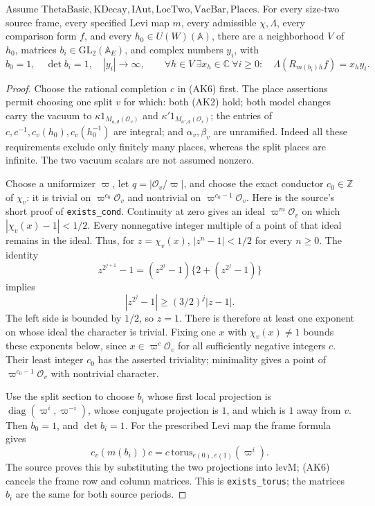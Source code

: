 \begin{srproposition}
\label{prop:sr-source-key-two-producer}
Assume \(\mathrm{ThetaBasic},\mathrm{KDecay},\mathrm{IAut},
\mathrm{LocTwo},\mathrm{VacBar},\mathrm{Places}\).
For every size-two source frame, every specified Levi map \(m\),
every admissible \(\chi,\Lambda\), every comparison form \(f\),
and every \(h_0\in U(W)(\mathbb A)\), there are a neighborhood
\(V\) of \(h_0\), matrices \(b_i\in\mathrm{GL}_2(\mathbb A_E)\),
and complex numbers \(y_i\), with
\[
 b_0=1,\quad \det b_i=1,\quad |y_i|\longrightarrow\infty,
 \qquad
 \forall h\in V\ \exists x_h\in\mathbb C\
 \forall i\ge0:\quad
              \Lambda(R_{m(b_i)h}f)=x_hy_i.
 \tag{AK10}\label{eq:sr-source-key-two-conclusion}
\]
\end{srproposition}
\begin{proof}
Choose the rational completion \(c\) in (AK6) first.
The place assertions permit choosing one split \(v\) for which:
both (AK2) hold; both model changes carry the vacuum to
\(\kappa1_{M_{a,d}(\mathcal O_v)}\) and
\(\kappa'1_{M_{a',d}(\mathcal O_v)}\);
the entries of \(c,c^{-1},c_v(h_0),c_v(h_0^{-1})\) are integral;
and \(\alpha_v,\beta_v\) are unramified.
Indeed all these requirements exclude only finitely many places,
whereas the split places are infinite.
The two vacuum scalars are not assumed nonzero.

Choose a uniformizer \(\varpi\), let \(q=|\mathcal O_v/\varpi|\),
and choose the exact conductor \(c_0\in\mathbb Z\) of
\(\chi_v\): it is trivial on \(\varpi^{c_0}\mathcal O_v\) and
nontrivial on \(\varpi^{c_0-1}\mathcal O_v\).
Here is the source's short proof of \texttt{exists\_cond}.
Continuity at zero gives an ideal \(\varpi^m\mathcal O_v\)
on which \(|\chi_v(x)-1|<1/2\).
Every nonnegative integer multiple of a point of that ideal
remains in the ideal. Thus, for \(z=\chi_v(x)\),
\(|z^n-1|<1/2\) for every \(n\ge0\).
The identity
\[
 z^{2^{j+1}}-1=(z^{2^j}-1)\{2+(z^{2^j}-1)\}
\]
implies
\[
 |z^{2^j}-1|\ge(3/2)^j|z-1|.
\]
The left side is bounded by \(1/2\), so \(z=1\).
There is therefore at least one exponent on whose ideal
the character is trivial. Fixing one \(x\) with
\(\chi_v(x)\ne1\) bounds these exponents below, since
\(x\in\varpi^c\mathcal O_v\) for all sufficiently negative
integers \(c\).
Their least integer \(c_0\) has the asserted triviality;
minimality gives a point of
\(\varpi^{c_0-1}\mathcal O_v\) with nontrivial character.

Use the split section to choose \(b_i\) whose first local projection
is \(\operatorname{diag}(\varpi^i,\varpi^{-i})\), whose conjugate
projection is \(1\), and which is \(1\) away from \(v\).
Then \(b_0=1\), and \(\det b_i=1\).
For the prescribed Levi map the frame formula gives
\[
 c_v(m(b_i))c
   =c\,\mathrm{torus}_{e(0),e(1)}(\varpi^i).
 \tag{AK11}\label{eq:sr-source-key-two-torus}
\]
The source proves this by substituting the two projections into
\(\mathrm{levM}\); (AK6) cancels the frame row and column matrices.
This is \texttt{exists\_torus}; the matrices \(b_i\) are the same for
both source periods.


\end{proof}
